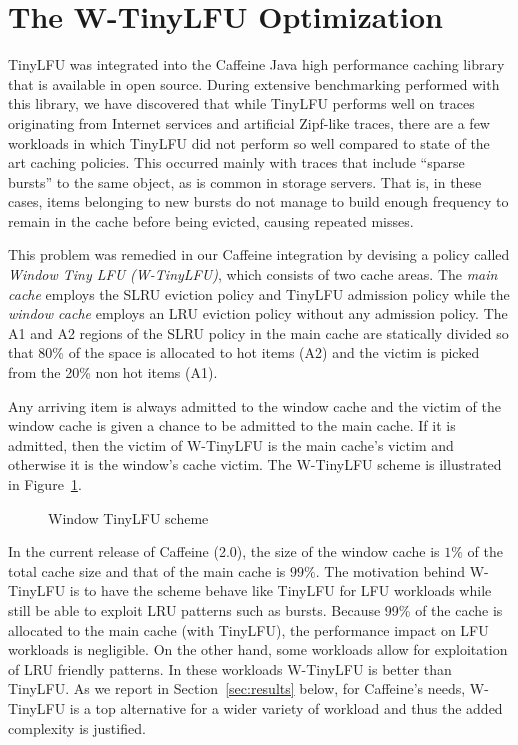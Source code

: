 \documentclass[10pt,a4paper]{article}
\begin{document}
\section{The W-TinyLFU Optimization}
\label{sec:caffeine}
TinyLFU was integrated into the Caffeine Java high performance caching library~\cite{CaffeineProject} that is available in open source.
During extensive benchmarking performed with this library, we have discovered that while TinyLFU performs well on traces originating from Internet services and artificial Zipf-like traces, there are a few workloads in which TinyLFU did not perform so well compared to state of the art caching policies.
This occurred mainly with traces that include ``sparse bursts'' to the same object, as is common in storage servers.
That is, in these cases, items belonging to new bursts do not manage to build enough frequency to remain in the cache before being evicted, causing repeated misses.

This problem was remedied in our Caffeine integration by devising a policy called \emph{Window Tiny LFU (W-TinyLFU)}, which consists of two cache areas.
The \emph{main cache} employs the SLRU eviction policy and TinyLFU admission policy while the \emph{window cache} employs an LRU eviction policy without any admission policy.
The A1 and A2 regions of the SLRU policy in the main cache are statically divided so that 80\% of the space is allocated to hot items (A2) and the victim is picked from the 20\% non hot items (A1).

Any arriving item is always admitted to the window cache and the victim of the window cache is given a chance to be admitted to the main cache.
If it is admitted, then the victim of W-TinyLFU is the main cache's victim and otherwise it is the window's cache victim.
The W-TinyLFU scheme is illustrated in Figure~\ref{fig:wtinylfu}.

\begin{figure}[t]
	\caption{Window TinyLFU scheme}
	\label{fig:wtinylfu}
\end{figure}

In the current release of Caffeine (2.0), the size of the window cache is $1\%$ of the total cache size and that of the main cache is $99\%$.
The motivation behind W-TinyLFU is to have the scheme behave like TinyLFU for LFU workloads while still be able to exploit LRU patterns such as bursts.
Because 99\% of the cache is allocated to the main cache (with TinyLFU), the performance impact on LFU workloads is negligible.
On the other hand, some workloads allow for exploitation of LRU friendly patterns.
In these workloads W-TinyLFU is better than TinyLFU.
As we report in Section~\ref{sec:results} below, for Caffeine's needs, W-TinyLFU is a top alternative for a wider variety of workload and thus the added complexity is justified.
\end{document}
